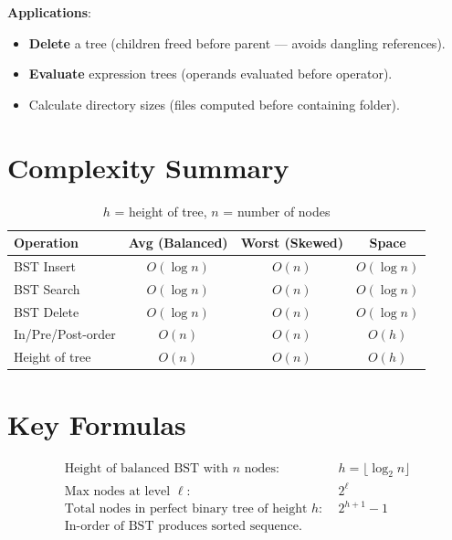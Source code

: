 \documentclass[12pt,a4paper]{article}
\begin{document}
\textbf{Applications}:
\begin{itemize}
    \item \textbf{Delete} a tree (children freed before parent — avoids dangling references).
    \item \textbf{Evaluate} expression trees (operands evaluated before operator).
    \item Calculate directory sizes (files computed before containing folder).
\end{itemize}

\newpage

\section{Complexity Summary}

\begin{table}[h!]
\centering
\renewcommand{\arraystretch}{1.5}
\begin{tabular}{|l|c|c|c|}
\hline
\textbf{Operation}     & \textbf{Avg (Balanced)} & \textbf{Worst (Skewed)} & \textbf{Space} \\
\hline
BST Insert             & $O(\log n)$              & $O(n)$                  & $O(\log n)$    \\
BST Search             & $O(\log n)$              & $O(n)$                  & $O(\log n)$    \\
BST Delete             & $O(\log n)$              & $O(n)$                  & $O(\log n)$    \\
In/Pre/Post-order      & $O(n)$                   & $O(n)$                  & $O(h)$         \\
Height of tree         & $O(n)$                   & $O(n)$                  & $O(h)$         \\
\hline
\end{tabular}
\caption{$h$ = height of tree, $n$ = number of nodes}
\end{table}

\section{Key Formulas}

\begin{align}
\text{Height of balanced BST with } n \text{ nodes:}\quad & h = \lfloor \log_2 n \rfloor \\
\text{Max nodes at level } \ell:\quad                       & 2^\ell \\
\text{Total nodes in perfect binary tree of height } h:\;  & 2^{h+1} - 1 \\
\text{In-order of BST produces sorted sequence.}
\end{align}
\end{document}

